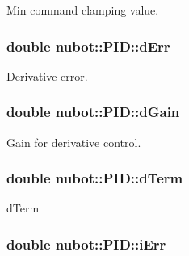 Min command clamping value. 

\hypertarget{classnubot_1_1PID_aa8ebb6b2cec73c281d83ac6882739320}{
\subsubsection[{d\-Err}]{\setlength{\rightskip}{0pt plus 5cm}double nubot\-::\-P\-I\-D\-::d\-Err\hspace{0.3cm}{\ttfamily [private]}}}\label{classnubot_1_1PID_aa8ebb6b2cec73c281d83ac6882739320}


Derivative error. 

\hypertarget{classnubot_1_1PID_a4e2f4ef996f5fd9628686b5111e3d0d3}{
\subsubsection[{d\-Gain}]{\setlength{\rightskip}{0pt plus 5cm}double nubot\-::\-P\-I\-D\-::d\-Gain\hspace{0.3cm}{\ttfamily [private]}}}\label{classnubot_1_1PID_a4e2f4ef996f5fd9628686b5111e3d0d3}


Gain for derivative control. 

\hypertarget{classnubot_1_1PID_a5b1af456567f8c17b81d4be70dbb1bb1}{
\subsubsection[{d\-Term}]{\setlength{\rightskip}{0pt plus 5cm}double nubot\-::\-P\-I\-D\-::d\-Term\hspace{0.3cm}{\ttfamily [private]}}}\label{classnubot_1_1PID_a5b1af456567f8c17b81d4be70dbb1bb1}


d\-Term 

\hypertarget{classnubot_1_1PID_abed7f1c0d6b47c154c5b8733d5c043ef}{
\subsubsection[{i\-Err}]{\setlength{\rightskip}{0pt plus 5cm}double nubot\-::\-P\-I\-D\-::i\-Err\hspace{0.3cm}{\ttfamily [private]}}}\label{classnubot_1_1PID_abed7f1c0d6b47c154c5b8733d5c043ef}


